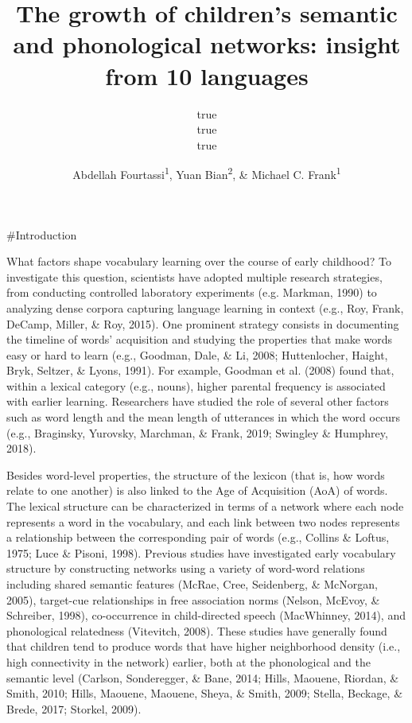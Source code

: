 \documentclass[english,,man,floatsintext]{apa6}
\title{The growth of children's semantic and phonological networks: insight from 10 languages}
\author{true \\ true \\ true}
\date{}
\author{Abdellah Fourtassi\textsuperscript{1}, Yuan Bian\textsuperscript{2}, \& Michael C. Frank\textsuperscript{1}}
\affiliation{
\vspace{0.5cm}
\textsuperscript{1} Department of Psychology, Stanford University\\\textsuperscript{2} Department of Brain and Cognitive Sciences, Massachusetts Institute of Technology}
\begin{document}
\maketitle

\#Introduction

What factors shape vocabulary learning over the course of early childhood? To investigate this question, scientists have adopted multiple research strategies, from conducting controlled laboratory experiments (e.g. Markman, 1990) to analyzing dense corpora capturing language learning in context (e.g., Roy, Frank, DeCamp, Miller, \& Roy, 2015). One prominent strategy consists in documenting the timeline of words' acquisition and studying the properties that make words easy or hard to learn (e.g., Goodman, Dale, \& Li, 2008; Huttenlocher, Haight, Bryk, Seltzer, \& Lyons, 1991). For example, Goodman et al. (2008) found that, within a lexical category (e.g., nouns), higher parental frequency is associated with earlier learning. Researchers have studied the role of several other factors such as word length and the mean length of utterances in which the word occurs (e.g., Braginsky, Yurovsky, Marchman, \& Frank, 2019; Swingley \& Humphrey, 2018).

Besides word-level properties, the structure of the lexicon (that is, how words relate to one another) is also linked to the Age of Acquisition (AoA) of words. The lexical structure can be characterized in terms of a network where each node represents a word in the vocabulary, and each link between two nodes represents a relationship between the corresponding pair of words (e.g., Collins \& Loftus, 1975; Luce \& Pisoni, 1998). Previous studies have investigated early vocabulary structure by constructing networks using a variety of word-word relations including shared semantic features (McRae, Cree, Seidenberg, \& McNorgan, 2005), target-cue relationships in free association norms (Nelson, McEvoy, \& Schreiber, 1998), co-occurrence in child-directed speech (MacWhinney, 2014), and phonological relatedness (Vitevitch, 2008). These studies have generally found that children tend to produce words that have higher neighborhood density (i.e., high connectivity in the network) earlier, both at the phonological and the semantic level (Carlson, Sonderegger, \& Bane, 2014; Hills, Maouene, Riordan, \& Smith, 2010; Hills, Maouene, Maouene, Sheya, \& Smith, 2009; Stella, Beckage, \& Brede, 2017; Storkel, 2009).
\end{document}
